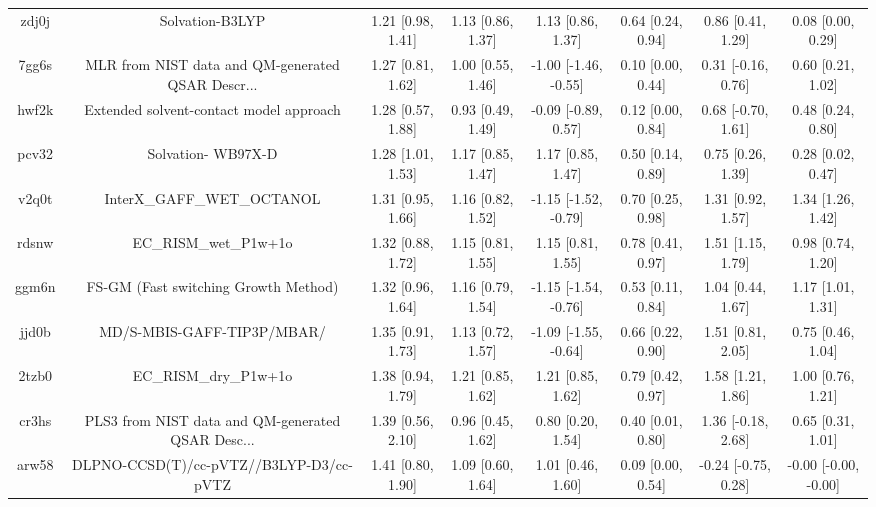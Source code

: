\documentclass{article}
\begin{document}
\begin{center}
\begin{longtable}{|cccccccc|}
 zdj0j &                                    Solvation-B3LYP &  1.21 [0.98, 1.41] &  1.13 [0.86, 1.37] &     1.13 [0.86, 1.37] &  0.64 [0.24, 0.94] &    0.86 [0.41, 1.29] &     0.08 [0.00, 0.29] \\
 7gg6s &  MLR from NIST data and QM-generated QSAR Descr... &  1.27 [0.81, 1.62] &  1.00 [0.55, 1.46] &  -1.00 [-1.46, -0.55] &  0.10 [0.00, 0.44] &   0.31 [-0.16, 0.76] &     0.60 [0.21, 1.02] \\
 hwf2k &            Extended solvent-contact model approach &  1.28 [0.57, 1.88] &  0.93 [0.49, 1.49] &   -0.09 [-0.89, 0.57] &  0.12 [0.00, 0.84] &   0.68 [-0.70, 1.61] &     0.48 [0.24, 0.80] \\
 pcv32 &                                 Solvation- WB97X-D &  1.28 [1.01, 1.53] &  1.17 [0.85, 1.47] &     1.17 [0.85, 1.47] &  0.50 [0.14, 0.89] &    0.75 [0.26, 1.39] &     0.28 [0.02, 0.47] \\
 v2q0t &                         InterX\_GAFF\_WET\_OCTANOL &  1.31 [0.95, 1.66] &  1.16 [0.82, 1.52] &  -1.15 [-1.52, -0.79] &  0.70 [0.25, 0.98] &    1.31 [0.92, 1.57] &     1.34 [1.26, 1.42] \\
 rdsnw &                              EC\_RISM\_wet\_P1w+1o &  1.32 [0.88, 1.72] &  1.15 [0.81, 1.55] &     1.15 [0.81, 1.55] &  0.78 [0.41, 0.97] &    1.51 [1.15, 1.79] &     0.98 [0.74, 1.20] \\
 ggm6n &               FS-GM (Fast switching Growth Method) &  1.32 [0.96, 1.64] &  1.16 [0.79, 1.54] &  -1.15 [-1.54, -0.76] &  0.53 [0.11, 0.84] &    1.04 [0.44, 1.67] &     1.17 [1.01, 1.31] \\
 jjd0b &                         MD/S-MBIS-GAFF-TIP3P/MBAR/ &  1.35 [0.91, 1.73] &  1.13 [0.72, 1.57] &  -1.09 [-1.55, -0.64] &  0.66 [0.22, 0.90] &    1.51 [0.81, 2.05] &     0.75 [0.46, 1.04] \\
 2tzb0 &                              EC\_RISM\_dry\_P1w+1o &  1.38 [0.94, 1.79] &  1.21 [0.85, 1.62] &     1.21 [0.85, 1.62] &  0.79 [0.42, 0.97] &    1.58 [1.21, 1.86] &     1.00 [0.76, 1.21] \\
 cr3hs &  PLS3 from NIST data and QM-generated QSAR Desc... &  1.39 [0.56, 2.10] &  0.96 [0.45, 1.62] &     0.80 [0.20, 1.54] &  0.40 [0.01, 0.80] &   1.36 [-0.18, 2.68] &     0.65 [0.31, 1.01] \\
 arw58 &            DLPNO-CCSD(T)/cc-pVTZ//B3LYP-D3/cc-pVTZ &  1.41 [0.80, 1.90] &  1.09 [0.60, 1.64] &     1.01 [0.46, 1.60] &  0.09 [0.00, 0.54] &  -0.24 [-0.75, 0.28] &  -0.00 [-0.00, -0.00] \\

\end{longtable}
\end{center}
\end{document}
